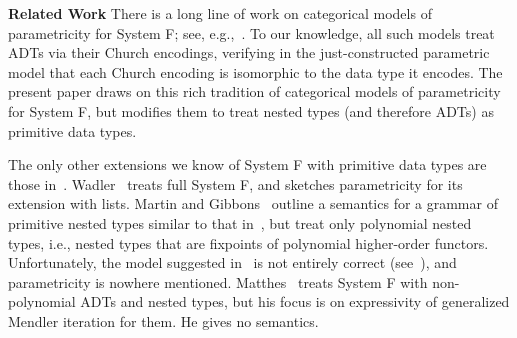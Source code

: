 \documentclass[runningheads]{llncs}
\begin{document}
\noindent
{\bf Related Work}\/
There is a long line of work on categorical models of parametricity
for System F; see,
e.g.,~\cite{bfss90,bm05,dr04,gjfor15,has94,jac99,mr92,rr94}.  To our
knowledge, all such models treat ADTs via their Church encodings,
verifying in the
just-constructed parametric model that
each Church encoding is isomorphic to the data type it encodes.
The present paper draws on this rich tradition of categorical models
of parametricity for System F, but modifies them to treat nested types
(and therefore ADTs) as primitive data types.
%
%

The only other extensions we know of System F with primitive data
types are those in~\cite{mat11,mg01,pit98,pit00,wad89}.
Wadler~\cite{wad89} treats full System F, and sketches parametricity
for its extension with lists. Martin and Gibbons~\cite{mg01} outline a
semantics for a grammar of primitive nested types similar to that
in~\cite{jp19}, but treat only polynomial nested types, i.e., nested
types that are fixpoints of polynomial higher-order
functors. Unfortunately, the model suggested in~\cite{mg01} is not
entirely correct (see~\cite{jp19}), and parametricity is nowhere
mentioned.  Matthes~\cite{mat11} treats System F with non-polynomial
ADTs and nested types, but his focus is on expressivity of generalized
Mendler iteration for them. He gives no semantics.
\end{document}
